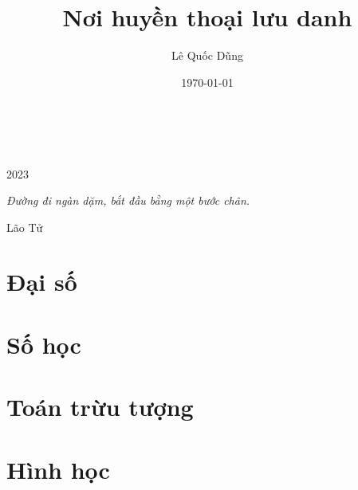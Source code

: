 \documentclass[oneside]{book}
\title{Nơi huyền thoại lưu danh}
\author{Lê Quốc Dũng}
\date{\today}
\begin{document}
\begin{titlepage}
		\\
			
		\vspace{10mm}
		\\
		\vspace{\fill}
		\centering \large{2023}
\end{titlepage}

\newpage

\vspace*{2cm}

\begin{center}
	{\Large 
			\textit{Đường đi ngàn dặm, bắt đầu bằng một bước chân.}
	}
	\Large{\parbox{10cm}{
		\begin{raggedleft}
		\vspace{.5cm}\hfill{Lão Tử}
		\end{raggedleft}
	}
}
\end{center}

\newpage

\tableofcontents

\newpage



\part{Đại số}


\part{Số học}


\part{Toán trừu tượng}




%

\part{Hình học}


\end{document}
